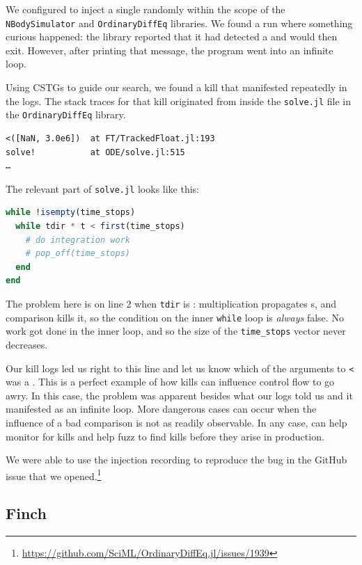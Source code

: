 \documentclass{juliacon}
\begin{document}
We configured \FT{} to inject a single \NaN{} randomly within the scope of the \texttt{NBodySimulator} and \texttt{OrdinaryDiffEq} libraries.
We found a run where something curious happened: the library reported that it had detected a \NaN{} and would then exit.
However, after printing that message, the program went into an infinite loop.

Using CSTGs to guide our search, we found a \NaN{} kill that manifested repeatedly in the logs.
The stack traces for that kill originated from inside the \texttt{solve.jl} file in the \texttt{OrdinaryDiffEq} library.

\begin{verbatim}
<([NaN, 3.0e6])  at FT/TrackedFloat.jl:193
solve!           at ODE/solve.jl:515
…
\end{verbatim}

The relevant part of \texttt{solve.jl} looks like this:


\begin{lstlisting}[language = Julia]
while !isempty(time_stops)
  while tdir * t < first(time_stops)
    # do integration work
    # pop_off(time_stops)
  end
end
\end{lstlisting}

The problem here is on line 2 when \texttt{tdir} is \NaN{}: multiplication propagates \NaN{}s, and comparison kills it, so the condition on the inner \texttt{while} loop is \emph{always} false.
No work got done in the inner loop, and so the size of the \texttt{time\_stops} vector never decreases.

Our kill logs led us right to this line and let us know which of the arguments to \texttt{<} was a \NaN{}.
This is a perfect example of how \NaN{} kills can influence control flow to go awry.
In this case, the problem was apparent besides what our logs told us and it manifested as an infinite loop.
More dangerous cases can occur when the influence of a bad comparison is not as readily observable.
In any case, \FT{} can help monitor for kills and help fuzz to find kills before they arise in production.

We were able to use the injection recording to reproduce the bug in the GitHub issue that we opened.\footnote{\url{https://github.com/SciML/OrdinaryDiffEq.jl/issues/1939}}

\subsection{Finch}
\label{s:finch}
\end{document}
